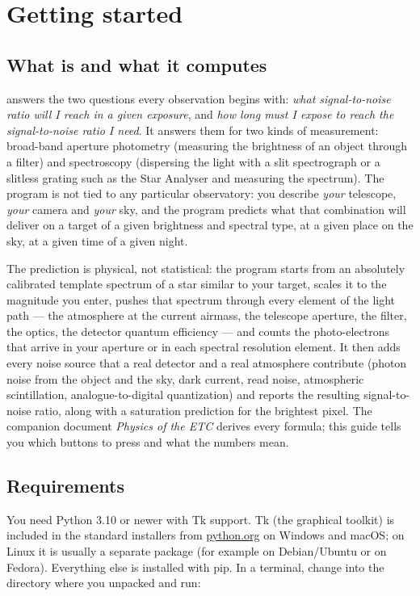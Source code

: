 \section{Getting started}

\subsection{What \spetc{} is and what it computes}

\spetc{} answers the two questions every observation begins with: \emph{what
signal-to-noise ratio will I reach in a given exposure}, and \emph{how long
must I expose to reach the signal-to-noise ratio I need}. It answers them
for two kinds of measurement: broad-band aperture photometry (measuring the
brightness of an object through a filter) and spectroscopy (dispersing the
light with a slit spectrograph or a slitless grating such as the Star
Analyser and measuring the spectrum). The program is not tied to any
particular observatory: you describe \emph{your} telescope, \emph{your}
camera and \emph{your} sky, and the program predicts what that combination
will deliver on a target of a given brightness and spectral type, at a
given place on the sky, at a given time of a given night.

The prediction is physical, not statistical: the program starts from an
absolutely calibrated template spectrum of a star similar to your target,
scales it to the magnitude you enter, pushes that spectrum through every
element of the light path --- the atmosphere at the current airmass, the
telescope aperture, the filter, the optics, the detector quantum
efficiency --- and counts the photo-electrons that arrive in your aperture
or in each spectral resolution element. It then adds every noise source
that a real detector and a real atmosphere contribute (photon noise from
the object and the sky, dark current, read noise, atmospheric
scintillation, analogue-to-digital quantization) and reports the resulting
signal-to-noise ratio, along with a saturation prediction for the
brightest pixel. The companion document \emph{Physics of the ETC} derives
every formula; this guide tells you which buttons to press and what the
numbers mean.

\subsection{Requirements}

You need Python 3.10 or newer with Tk support. Tk (the graphical toolkit)
is included in the standard installers from \url{python.org} on Windows
and macOS; on Linux it is usually a separate package (for example
 on Debian/Ubuntu or
 on Fedora). Everything else is
installed with pip. In a terminal, change into the directory where you
unpacked \spetc{} and run:

